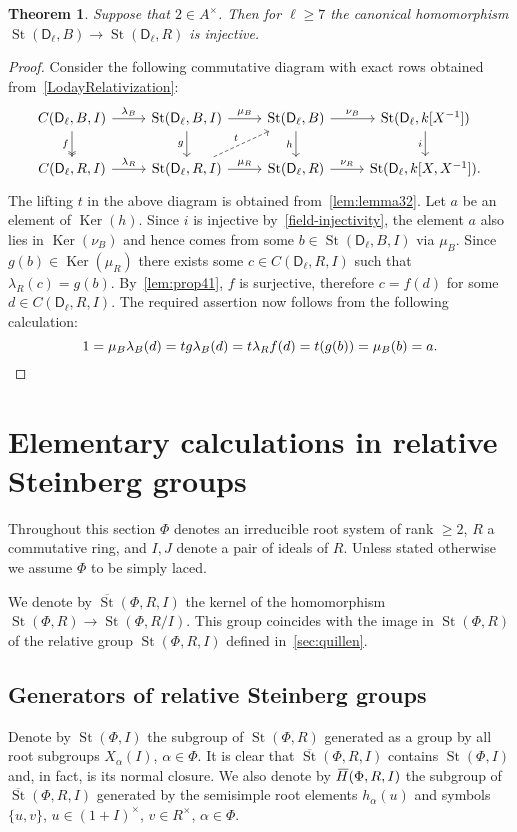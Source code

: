 \documentclass[10pt,a4paper,twoside]{article}
\newtheorem{theorem}{Theorem}
\theoremstyle{remark}
\theoremstyle{definition}
\numberwithin{lemma}{section}
\numberwithin{prop}{section}
\numberwithin{corollary}{section}
\numberwithin{externaltheorem}{section}
\DeclareMathOperator{\Ker}{Ker}
\DeclareMathOperator{\St}{St}
\newcommand{\myol}[2][3]{{}\mkern#1mu\overline{\mkern-#1mu#2}}
\newcommand{\rD}{\mathsf{D}}
\numberwithin{equation}{section}
\begin{document}
\begin{theorem} \label{thm41} Suppose that $2 \in A^\times$. Then for $\ell \geq 7$ the canonical homomorphism $\St(\rD_\ell, B) \to \St(\rD_\ell, R)$ is injective. \end{theorem}
\begin{proof}
 Consider the following commutative diagram with exact rows obtained from~\eqref{LodayRelativization}:
\[\begin{tikzcd} C(\rD_\ell, B, I) \arrow{r}{\lambda_B} \arrow[d, swap, "f", twoheadrightarrow] & \St(\rD_\ell, B, I) \arrow{r}{\mu_B} \arrow{d}[swap]{g} & \St(\rD_\ell, B) \arrow{r}{\nu_B} \arrow{d}[swap]{h} & \St(\rD_\ell, k[X^{-1}]) \arrow{d}[swap]{i} \\ C(\rD_\ell, R, I) \arrow{r}{\lambda_R} & \St(\rD_\ell, R, I) \arrow{r}{\mu_R} \arrow[ur, "t", dashrightarrow] & \St(\rD_\ell, R) \arrow{r}{\nu_R} & \St(\rD_\ell, k[X, X^{-1}]).\end{tikzcd}\]
The lifting $t$ in the above diagram is obtained from~\cref{lem:lemma32}.
Let $a$ be an element of $\Ker(h)$. Since $i$ is injective by~\cref{field-injectivity}, the element $a$
 also lies in $\Ker(\nu_B)$ and hence comes from some $b \in \St(\rD_\ell, B, I)$ via $\mu_B$.
Since $g(b) \in \Ker(\mu_R)$ there exists some $c \in C(\rD_\ell, R, I)$ such that $\lambda_R(c) = g(b)$. 
By~\cref{lem:prop41}, $f$ is surjective, therefore $c = f(d)$ for some $d \in C(\rD_\ell, R, I)$.
The required assertion now follows from the following calculation:
 \[ 1 = \mu_B\lambda_B(d) = tg\lambda_B(d) = t\lambda_Rf(d) =t(g(b)) = \mu_B(b) = a. \qedhere \]
\end{proof}

\section{Elementary calculations in relative Steinberg groups}\label{sec:elementary}
Throughout this section $\Phi$ denotes an irreducible root system of rank $\geq 2$, $R$ a commutative ring, and $I, J$ denote a pair of ideals of $R$.
Unless stated otherwise we assume $\Phi$ to be simply laced.

We denote by $\overline{\St}(\Phi, R, I)$ the kernel of the homomorphism $\St(\Phi, R) \to \St(\Phi, R/I)$.
This group coincides with the image in $\St(\Phi, R)$ of the relative group $\St(\Phi, R, I)$ defined in~\cref{sec:quillen}.

\subsection{Generators of relative Steinberg groups}
Denote by $\St(\Phi, I)$ the subgroup of $\St(\Phi, R)$ generated as a group by all root subgroups $X_\alpha(I)$, $\alpha\in\Phi$.
It is clear that $\overline{\St}(\Phi, R, I)$ contains $\St(\Phi, I)$ and, in fact, is its normal closure.
We also denote by $\myol{H}(\Phi, R, I)$ the subgroup of $\overline{\St}(\Phi, R, I)$ generated by the semisimple root elements $h_\alpha(u)$ and symbols $\{u, v\}$, $u \in (1+I)^\times$, $v \in R^\times$, $\alpha\in \Phi$.
\end{document}
